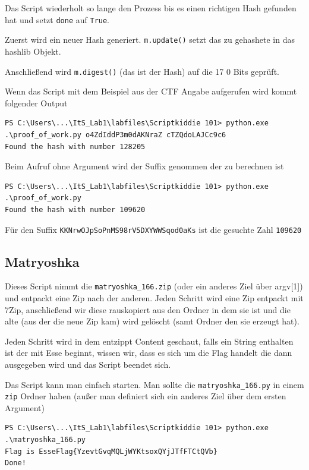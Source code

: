 \documentclass[12pt,a4paper,titlepage,oneside]{scrartcl}
\begin{document}
Das Script wiederholt so lange den Prozess bis es einen richtigen Hash gefunden hat und setzt \lstinline{done} auf \lstinline{True}.

Zuerst wird ein neuer Hash generiert. \lstinline{m.update()} setzt das zu gehashete in das hashlib Objekt.

Anschließend wird \lstinline{m.digest()} (das ist der Hash) auf die 17 0 Bits geprüft.

Wenn das Script mit dem Beispiel aus der CTF Angabe aufgerufen wird kommt folgender Output

\begin{lstlisting}
PS C:\Users\...\ItS_Lab1\labfiles\Scriptkiddie 101> python.exe .\proof_of_work.py o4ZdIddP3m0dAKNraZ cTZQdoLAJCc9c6
Found the hash with number 128205
\end{lstlisting}

Beim Aufruf ohne Argument wird der Suffix genommen der zu berechnen ist

\begin{lstlisting}
PS C:\Users\...\ItS_Lab1\labfiles\Scriptkiddie 101> python.exe .\proof_of_work.py
Found the hash with number 109620
\end{lstlisting}

Für den Suffix \lstinline{KKNrwOJpSoPnMS98rV5DXYWWSqod0aKs} ist die gesuchte Zahl \lstinline{109620}

\subsection{Matryoshka}


Dieses Script nimmt die \lstinline{matryoshka_166.zip} (oder ein anderes Ziel über argv[1]) und entpackt eine Zip nach der anderen. Jeden Schritt wird eine Zip entpackt mit 7Zip, anschließend wir diese rauskopiert aus den Ordner in dem sie ist und die alte (aus der die neue Zip kam) wird gelöscht (samt Ordner den sie erzeugt hat).

Jeden Schritt wird in dem entzippt Content geschaut, falls ein String enthalten ist der mit Esse beginnt, wissen wir, dass es sich um die Flag handelt die dann ausgegeben wird und das Script beendet sich.

Das Script kann man einfach starten. Man sollte die \lstinline{matryoshka_166.py} in einem \lstinline{zip} Ordner haben (außer man definiert sich ein anderes Ziel über dem ersten Argument)

\begin{lstlisting}
PS C:\Users\...\ItS_Lab1\labfiles\Scriptkiddie 101> python.exe .\matryoshka_166.py
Flag is EsseFlag{YzevtGvqMQLjWYKtsoxQYjJTfFTCtQVb}
Done! 
\end{lstlisting}

%
%
\end{document}
